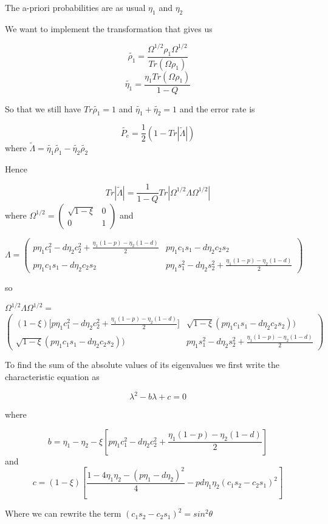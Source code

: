 \documentclass[12pt,oneside,english,reqno]{amsbook}
\numberwithin{section}{chapter}
\numberwithin{equation}{section}
\numberwithin{figure}{section}
\newcommand{\abs}[1]{\left|{#1}\right|}
\newcommand{\td}[1]{\widetilde{#1}}
\begin{document}
The a-priori probabilities are as usual $\eta_1$ and $\eta_2$

We want to implement the transformation that gives us

\[ \td {\rho_1} = \frac{\Omega^{1/2} \rho_1 \Omega^{1/2}}{Tr(\Omega \rho_1)} \]
\[ \td {\eta_1} = \frac{\eta_1 Tr (\Omega \rho_1)}{1-Q}\] 

So that we still have $Tr \td {\rho_1} = 1 $ and $\td {\eta_1 } + \td {\eta_2} = 1$
and the error rate is

\[\td{P_e} = \frac{1}{2}(1 - Tr \abs{\td{\Lambda}})\]
where $\td{\Lambda} = \td{\eta_1}\td{\rho_1} - \td{\eta_2}\td{\rho_2}$

Hence 

\[Tr \abs{\td{\Lambda}} = \frac{1}{1-Q} Tr \abs{\Omega^{1/2}\Lambda \Omega^{1/2}}\]
where $\Omega^{1/2} =  \left( \begin{array}{cc}
\sqrt{1- \xi} & 0 \\
0 & 1 \end{array} \right)$ and

$\Lambda = \left( \begin{array}{cc}
{p\eta_1c_1^2-d\eta_2c_2^2 + \frac{\eta_1(1-p) -\eta_2(1-d)}{2}} &{ p\eta_1c_1s_1-d\eta_2c_2s_2} \\
{p\eta_1c_1s_1-d\eta_2c_2s_2} & {p\eta_1s_1^2-d\eta_2s_2^2 + \frac{\eta_1(1-p) -\eta_2(1-d)}{2}}\end{array} \right)$ 

so

$\Omega^{1/2}\Lambda \Omega^{1/2} =$
\[
 \left( \begin{array}{cc}
{(1-\xi)[p\eta_1c_1^2-d\eta_2c_2^2 + \frac{\eta_1(1-p) -\eta_2(1-d)}{2}}] &{\sqrt{1-\xi}( p\eta_1c_1s_1-d\eta_2c_2s_2))} \\
{\sqrt{1-\xi}( p\eta_1c_1s_1-d\eta_2c_2s_2))} & {p\eta_1s_1^2-d\eta_2s_2^2 + \frac{\eta_1(1-p) -\eta_2(1-d)}{2}}\end{array} \right)\]

To find the sum of the absolute values of its eigenvalues we first write the characteristic equation as

\[ \lambda^2 - b \lambda + c = 0\]

where

\[b = \eta_1 -\eta_2 - \xi [ p\eta_1 c_1^2 - d\eta_2 c_2^2 + \frac{\eta_1(1-p) - \eta_2(1-d)}{2}]\]
and
\[c = (1-\xi)[ \frac{1- 4\eta_1\eta_2 -(p\eta_1 -d \eta_2)^2}{4} -pd \eta_1\eta_2 (c_1s_2-c_2s_1)^2]\]

Where we can rewrite the term $ (c_1s_2-c_2s_1)^2 = sin^2 \theta$ 
\end{document}

